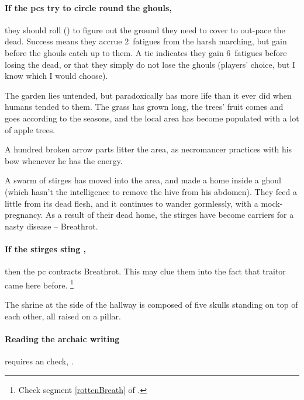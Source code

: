 \begin{multicols}{2}
\paragraph{If the \glspl{pc} try to circle round the ghouls,}
they should roll  (\tn[8]) to figure out the ground they need to cover to out-pace the dead.
Success means they accrue 2~\glspl{fatigue} from the harsh marching, but gain  before the ghouls catch up to them.
A tie indicates they gain 6~\glspl{fatigue} before losing the dead, or that they simply do not lose the ghouls (players' choice, but I know which I would choose).


The garden lies untended, but paradoxically has more life than it ever did when humans tended to them.
The grass has grown long, the trees' fruit comes and goes according to the seasons, and the local area has become populated with a lot of apple trees.

A hundred broken arrow parts litter the area, as \gls{necromancer} practices with his bow whenever he has the energy.


A swarm of stirges%
has moved into the area, and made a home inside a ghoul (which hasn't the intelligence to remove the hive from his abdomen).
They feed a little from its dead flesh, and it continues to wander gormlessly, with a mock-pregnancy.
As a result of their dead home, the stirges have become carriers for a nasty disease -- Breathrot.%

\stirgeGhouls

\paragraph{If the stirges sting ,}
then the \gls{pc} contracts Breathrot.
This may clue them into the fact that \gls{traitor} came here before.%
\footnote{\label{broTheftRef}Check \gls{segment} \vref{rottenBreath} of .}


The shrine at the side of the hallway is composed of five skulls standing on top of each other, all raised on a pillar.

\paragraph{Reading the archaic writing}
requires an  check, \tn[10].


\end{multicols}
